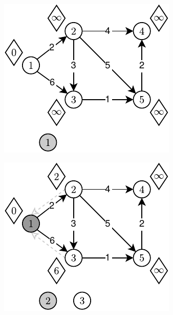 \begin{figure}[!htbp]
	\centering
	\begin{subfigure}[b]{0.3\textwidth}
		\includegraphics[width=\textwidth]{Chapter_III/GRAPH-GROWTH-2Q-Example/a.pdf}
		\caption{}
	\end{subfigure}
	\quad
	\begin{subfigure}[b]{0.3\textwidth}
		\includegraphics[width=\textwidth]{Chapter_III/GRAPH-GROWTH-2Q-Example/b.pdf}

\end{subfigure}
\end{figure}
